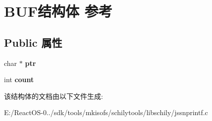 \hypertarget{struct_b_u_f}{}\section{B\+U\+F结构体 参考}
\label{struct_b_u_f}
\subsection*{Public 属性}
\begin{DoxyCompactItemize}
\item 
\mbox{\label{struct_b_u_f_add157c4cd2ee61bf71474dde84441dd0}} 
char $\ast$ {\bfseries ptr}
\item 
\mbox{\label{struct_b_u_f_a899eb3a6b16594f2de6a48ca310726b7}} 
int {\bfseries count}
\end{DoxyCompactItemize}


该结构体的文档由以下文件生成\+:\begin{DoxyCompactItemize}
\item 
E\+:/\+React\+O\+S-\/0../sdk/tools/mkisofs/schilytools/libschily/jssnprintf.\+c\end{DoxyCompactItemize}

